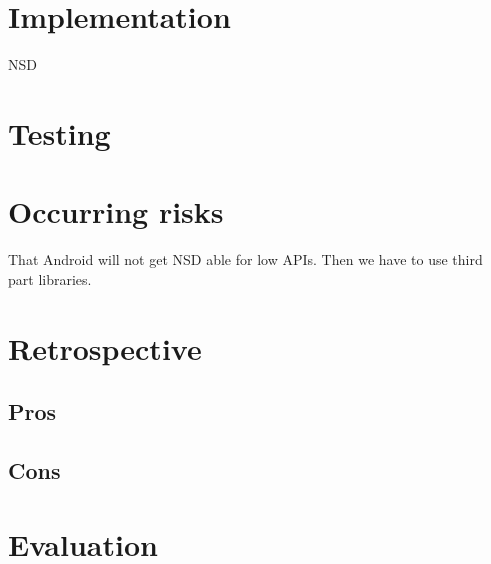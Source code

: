 \section{Implementation}

NSD
\section{Testing}

\section{Occurring risks}

That Android will not get NSD able for low APIs. 
Then we have to use third part libraries.

\section{Retrospective}
\subsection{Pros}
\subsection{Cons}
\section{Evaluation}
